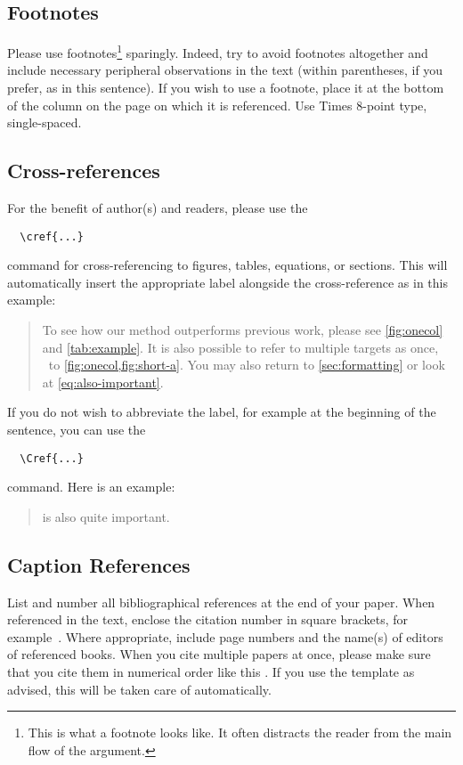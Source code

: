 \documentclass[10pt,twocolumn,letterpaper]{article}
\begin{document}
\subsection{Footnotes}
Please use footnotes\footnote{This is what a footnote looks like.
It often distracts the reader from the main flow of the argument.} sparingly.
Indeed, try to avoid footnotes altogether and include necessary peripheral observations in the text (within parentheses, if you prefer, as in this sentence).
If you wish to use a footnote, place it at the bottom of the column on the page on which it is referenced.
Use Times 8-point type, single-spaced.
\subsection{Cross-references}
For the benefit of author(s) and readers, please use the
{\small\begin{verbatim}
  \cref{...}
\end{verbatim}}  command for cross-referencing to figures, tables, equations, or sections.
This will automatically insert the appropriate label alongside the cross-reference as in this example:
\begin{quotation}
  To see how our method outperforms previous work, please see \cref{fig:onecol} and \cref{tab:example}.
  It is also possible to refer to multiple targets as once, \eg~to \cref{fig:onecol,fig:short-a}.
  You may also return to \cref{sec:formatting} or look at \cref{eq:also-important}.
\end{quotation}
If you do not wish to abbreviate the label, for example at the beginning of the sentence, you can use the
{\small\begin{verbatim}
  \Cref{...}
\end{verbatim}}
command. Here is an example:
\begin{quotation}
   is also quite important.
\end{quotation}
\subsection{Caption References}
List and number all bibliographical references at the end of your paper.
When referenced in the text, enclose the citation number in square brackets, for
example~\cite{Authors14}.
Where appropriate, include page numbers and the name(s) of editors of referenced books.
When you cite multiple papers at once, please make sure that you cite them in numerical order like this \cite{Alpher02,Alpher03,Alpher05,Authors14b,Authors14}.
If you use the template as advised, this will be taken care of automatically.
\end{document}
